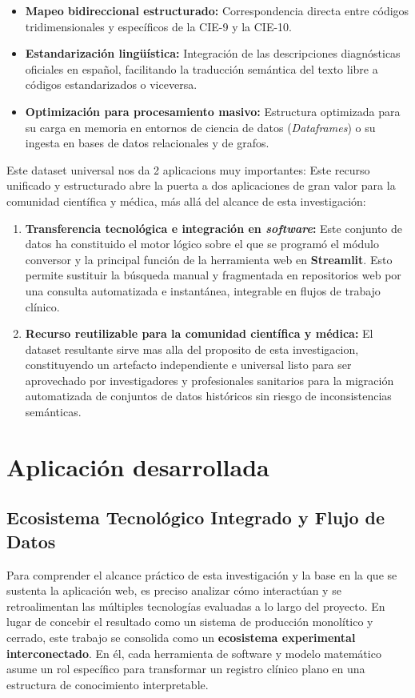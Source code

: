 \documentclass[12pt,a4paper,onecolumn,oneside]{report}
\begin{document}
\begin{itemize}
    \item \textbf{Mapeo bidireccional estructurado:} Correspondencia directa entre códigos tridimensionales y específicos de la CIE-9 y la CIE-10.
    \item \textbf{Estandarización lingüística:} Integración de las descripciones diagnósticas oficiales en español, facilitando la traducción semántica del texto libre a códigos estandarizados o viceversa.
    \item \textbf{Optimización para procesamiento masivo:} Estructura optimizada para su carga en memoria en entornos de ciencia de datos (\textit{Dataframes}) o su ingesta en bases de datos relacionales y de grafos.
\end{itemize}

Este dataset universal nos da 2 aplicacions muy importantes:
Este recurso unificado y estructurado abre la puerta a dos aplicaciones de gran valor para la comunidad científica y médica, más allá del alcance de esta investigación:
\begin{enumerate}
    \item \textbf{Transferencia tecnológica e integración en \textit{software}:} Este conjunto de datos ha constituido el motor lógico sobre el que se programó el módulo conversor y la principal función de la herramienta web en \textbf{Streamlit}. Esto permite sustituir la búsqueda manual y fragmentada en repositorios web por una consulta automatizada e instantánea, integrable en flujos de trabajo clínico.
    \item \textbf{Recurso reutilizable para la comunidad científica y médica:} El dataset resultante sirve mas alla del proposito de esta investigacion, constituyendo un artefacto independiente e universal listo para ser aprovechado por investigadores y profesionales sanitarios para la migración automatizada de conjuntos de datos históricos sin riesgo de inconsistencias semánticas.
\end{enumerate}

\chapter{Aplicación desarrollada}

\section{Ecosistema Tecnológico Integrado y Flujo de Datos}
Para comprender el alcance práctico de esta investigación y la base en la que se sustenta la aplicación web, es preciso analizar cómo interactúan y se retroalimentan las múltiples tecnologías evaluadas a lo largo del proyecto. En lugar de concebir el resultado como un sistema de producción monolítico y cerrado, este trabajo se consolida como un \textbf{ecosistema experimental interconectado}. En él, cada herramienta de software y modelo matemático asume un rol específico para transformar un registro clínico plano en una estructura de conocimiento interpretable.
\end{document}
